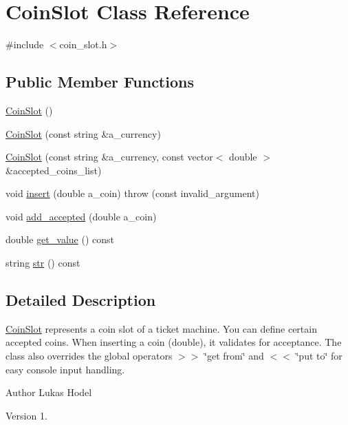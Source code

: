 \hypertarget{classCoinSlot}{\section{Coin\-Slot Class Reference}
\label{classCoinSlot}
}


{\ttfamily \#include $<$coin\-\_\-slot.\-h$>$}

\subsection*{Public Member Functions}
\begin{DoxyCompactItemize}
\item 
\hyperlink{classCoinSlot_a7ee2abc60da5a7af641eff10c5c4c2bf}{Coin\-Slot} ()
\item 
\hyperlink{classCoinSlot_a0b2fe39a7b9e9d13df98735a85af986c}{Coin\-Slot} (const string \&a\-\_\-currency)
\item 
\hyperlink{classCoinSlot_ae3fcb033d930eb7827649e2740275aca}{Coin\-Slot} (const string \&a\-\_\-currency, const vector$<$ double $>$ \&accepted\-\_\-coins\-\_\-list)
\item 
void \hyperlink{classCoinSlot_aeb67f3b2b68ed5c22c1d6f192f315104}{insert} (double a\-\_\-coin)  throw (const invalid\-\_\-argument)
\item 
void \hyperlink{classCoinSlot_a8ed8cda62086c21f647d215f47d31b3b}{add\-\_\-accepted} (double a\-\_\-coin)
\item 
double \hyperlink{classCoinSlot_aa349eea94746d3438335c7ef5337bf7c}{get\-\_\-value} () const 
\item 
string \hyperlink{classCoinSlot_af37381120a0315178139de6ce447741d}{str} () const 
\end{DoxyCompactItemize}


\subsection{Detailed Description}
\hyperlink{classCoinSlot}{Coin\-Slot} represents a coin slot of a ticket machine. You can define certain accepted coins. When inserting a coin (double), it validates for acceptance. The class also overrides the global operators $>$$>$ \char`\"{}get from\char`\"{} and $<$$<$ \char`\"{}put to\char`\"{} for easy console input handling.

\begin{DoxyAuthor}{Author}
Lukas Hodel 
\end{DoxyAuthor}
\begin{DoxyVersion}{Version}
1. 
\end{DoxyVersion}


